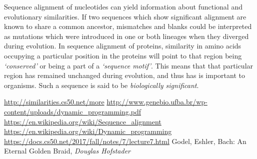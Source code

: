 \documentclass[11pt,a4paper]{article}
\begin{document}
				Sequence alignment of nucleotides can yield information about functional and evolutionary similarities. If two sequences which show significant alignment are known to share a common ancestor, mismatches and blanks could be interpreted as mutations which were introduced in one or both lineages
				when they diverged during evolution. In sequence alignment of proteins, similarity in amino acids occupying a particular position in the proteins will point to that region being \emph{`conserved'} or being a part of a \emph{`sequence motif'}. This means that that particular region has remained unchanged during evolution, and thus has is important to organisms. Such a sequence is said to be \emph{biologically significant}. 

				\begin{thebibliography}{99}
					\url{http://similarities.cs50.net/more}
					\url{http://www.genebio.ufba.br/wp-content/uploads/dynamic_programming.pdf}
					\url{https://en.wikipedia.org/wiki/Sequence_alignment}
					\url{https://en.wikipedia.org/wiki/Dynamic_programming}
					\url{https://docs.cs50.net/2017/fall/notes/7/lecture7.html}
					Godel, Eshler, Bach: An Eternal Golden Braid, \emph{Douglas Hofstader}
				\end{thebibliography}


			
\end{document}
